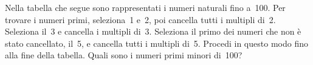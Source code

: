 \begin{esercizio}
\begin{multicols}{2}
Nella tabella che segue sono rappresentati i numeri naturali fino a~100. Per 
trovare i
numeri primi, seleziona~1 e~2, poi cancella tutti i multipli di~2. Seleziona 
il~3 e cancella i multipli di~3. Seleziona il
primo dei numeri che non è stato cancellato, il~5, e cancella
tutti i multipli di~5. Procedi in questo modo fino alla fine
della tabella. Quali sono i numeri primi minori di~100?

\columnbreak\vfil

\end{multicols}
\end{esercizio}

\subsubsection*{}


